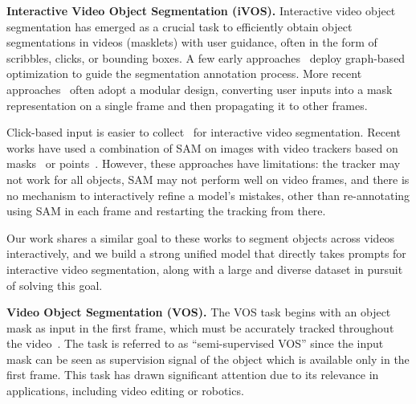\documentclass[]{fairmeta}
\renewcommand{\paragraph}[1]{\vspace{1.25mm}\noindent\textbf{#1}}
\renewcommand{\paragraph}[1]{\vspace{1.25mm}\noindent\textbf{#1}}
\begin{document}
\paragraph{Interactive Video Object Segmentation (iVOS).} Interactive video object segmentation has emerged as a crucial task to efficiently obtain object segmentations in videos (masklets) with user guidance, often in the form of scribbles, clicks, or bounding boxes. A few early approaches~\citep{wang2005interactive,bai2007geodesic,fan2015jumpcut} deploy graph-based optimization to guide the segmentation annotation process. More recent approaches~\citep{heo2020interactive,cheng2021modular,delatolas2024learning} often adopt a modular design, converting user inputs into a mask representation on a single frame and then propagating it to other frames. 

Click-based input is easier to collect~\citep{homayounfar2021videoclick} for interactive video segmentation. 
Recent works have used a combination of SAM on images with video trackers based on masks~\citep{Cheng2023TrackingAW,yang2023track,cheng2023segment} or points~\citep{rajic2023segment}. However, these approaches have limitations: the tracker may not work for all objects, SAM may not perform well on video frames, and there is no mechanism to interactively refine a model's mistakes, other than re-annotating using SAM in each frame and restarting the tracking from there. 

Our work shares a similar goal to these works to segment objects across videos interactively, and we build a strong unified model that directly takes prompts for interactive video segmentation, along with a large and diverse dataset in pursuit of solving this goal.

\paragraph{Video Object Segmentation (VOS).} The VOS task begins with an object mask as input in the first frame, which must be accurately tracked throughout the video~\citep{Pont-Tuset_arXiv_2017}. The task is referred to as ``semi-supervised VOS'' since the input mask can be seen as supervision signal of the object which is available only in the first frame. This task has drawn significant attention due to its relevance in applications, including video editing or robotics.
\end{document}
